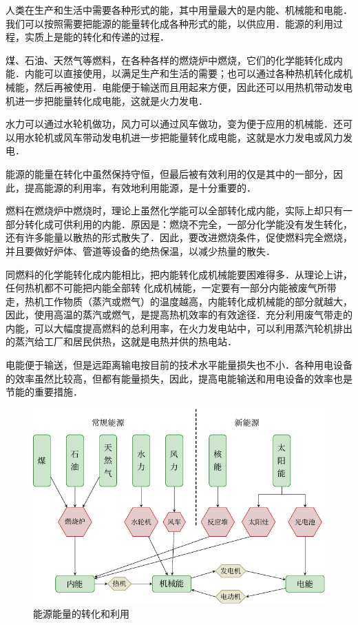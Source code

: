 人类在生产和生活中需要各种形式的能，其中用量最大的是内能、机械能和电能．我们可以按照需要把能源的能量转化成各种形式的能，以供应用．能源的利用过程，实质上是能的转化和传递的过程．

煤、石油、天然气等燃料，在各种各样的燃烧炉中燃烧，它们的化学能转化成内能．内能可以直接使用，以满足生产和生活的需要；也可以通过各种热机转化成机械能，然后再被使用．电能便于输送而且用起来方便，因此还可以用热机带动发电机进一步把能量转化成电能，这就是火力发电．

水力可以通过水轮机做功，风力可以通过风车做功，变为便于应用的机械能．还可以用水轮机或风车带动发电机进一步把能量转化成电能，这就是水力发电或风力发电．

能源的能量在转化中虽然保持守恒，但最后被有效利用的仅是其中的一部分，因此，提高能源的利用率，有效地利用能源，是十分重要的．

燃料在燃烧炉中燃烧时，理论上虽然化学能可以全部转化成内能，实际上却只有一部分转化成可供利用的内能．原因是：燃烧不完全，一部分化学能没有发生转化，还有许多能量以散热的形式散失了．因此，要改进燃烧条件，促使燃料完全燃烧，并且要做好炉体、管道等设备的绝热保温，以减少热量的散失．

同燃料的化学能转化成内能相比，把内能转化成机械能要困难得多．从理论上讲，任何热机都不可能把内能全部转
化成机械能，一定要有一部分内能被废气所带走，热机工作物质（蒸汽或燃气）的温度越高，内能转化成机械能的部分就越大，因此，使用高温的蒸汽或燃气，是提高热机效率的有效途径．充分利用废气带走的内能，可以大幅度提高燃料的总利用率，在火力发电站中，可以利用蒸汽轮机排出的蒸汽给工厂和居民供热，这就是电热并供的热电站．

电能便于输送，但是远距离输电按目前的技术水平能量损失也不小．各种用电设备的效率虽然比较高，但都有能量损失，因此，提高电能输送和用电设备的效率也是节能的重要措施．

\begin{figure}[htbp]
    \centering
    \includegraphics{fig/B/2-3.pdf}
    \caption{能源能量的转化和利用}\label{fig_B_2-3}
\end{figure}

